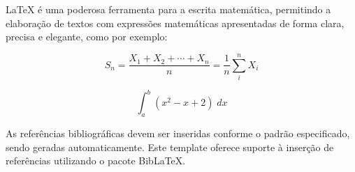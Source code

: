 \documentclass[12pt]{article}
\begin{document}
\LaTeX{} é uma poderosa ferramenta para a escrita matemática, permitindo a
elaboração de textos com expressões matemáticas apresentadas de forma clara,
precisa e elegante, como por exemplo:

\[S_n = \frac{X_1 + X_2 + \cdots + X_n}{n}
      = \frac{1}{n}\sum_{i}^{n} X_i\]

\begin{equation}
    \int_a^b \left(x^2 - x + 2\right) \; dx
\end{equation}

As referências bibliográficas devem ser inseridas conforme o padrão
especificado, sendo geradas automaticamente. Este template oferece suporte à
inserção de referências utilizando o pacote BibLaTeX.

%
%


\end{document}
